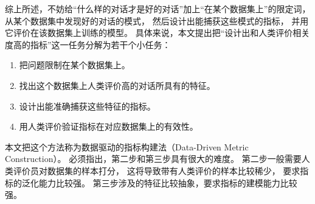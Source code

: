 综上所述，不妨给“什么样的对话才是好的对话”加上“在某个数据集上”的限定词，
从某个数据集中发现好的对话的模式，
然后设计出能捕获这些模式的指标，
并用它评价在该数据集上训练的模型。
具体来说，本文提出把“设计出和人类评价相关度高的指标”这一任务分解为若干个小任务：
\begin{enumerate}
    \item 把问题限制在某个数据集上。
    \item 找出这个数据集上人类评价高的对话所具有的特征。
    \item 设计出能准确捕获这些特征的指标。
    \item 用人类评价验证指标在对应数据集上的有效性。
\end{enumerate}

本文把这个方法称为数据驱动的指标构建法（Data-Driven Metric Construction）。
必须指出，第二步和第三步具有很大的难度。
第二步一般需要人类评价员对数据集的样本打分，
这将导致带有人类评价的样本比较稀少，
要求指标的泛化能力比较强。
第三步涉及的特征比较抽象，要求指标的建模能力比较强。
